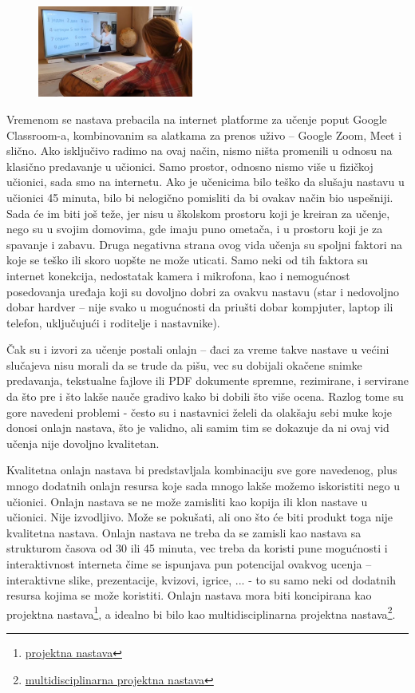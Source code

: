 \documentclass[a4paper]{article}
\begin{document}
\begin{figure}[h!]
        \centering\includegraphics[height=3cm]{onlajn-nastava.jpg} 
        \caption{}
        \label{fig:onlajn nastava}
\end{figure}
Vremenom se nastava prebacila na internet platforme za učenje poput Google Classroom-a, kombinovanim sa alatkama za prenos uživo – Google Zoom, Meet i slično. Ako isključivo radimo na ovaj način, nismo ništa promenili u odnosu na klasično predavanje u učionici. Samo prostor, odnosno nismo više u fizičkoj učionici, sada smo na internetu. Ako je učenicima bilo teško da slušaju nastavu u učionici 45 minuta, bilo bi nelogično pomisliti da bi ovakav način bio uspešniji. Sada će im biti još teže, jer nisu u školskom prostoru koji je kreiran za učenje, nego su u svojim domovima, gde imaju puno ometača, i u prostoru koji je za spavanje i zabavu. Druga negativna strana ovog vida učenja su spoljni faktori na koje se teško ili skoro uopšte ne može uticati. Samo neki od tih faktora su internet konekcija, nedostatak kamera i mikrofona, kao i nemogućnost posedovanja uređaja koji su dovoljno dobri za ovakvu nastavu (star i nedovoljno dobar hardver – nije svako u mogućnosti da priušti dobar kompjuter, laptop ili telefon, uključujući i roditelje i nastavnike).

Čak su i izvori za učenje postali onlajn – đaci za vreme takve nastave u većini slučajeva nisu morali da se trude da pišu, vec su dobijali okačene snimke predavanja, tekstualne fajlove ili PDF dokumente spremne, rezimirane, i servirane da što pre i što lakše nauče gradivo kako bi dobili što više ocena. Razlog tome su gore navedeni problemi -  često su i nastavnici želeli da olakšaju sebi muke koje donosi onlajn nastava, što je validno, ali samim tim se dokazuje da ni ovaj vid učenja nije dovoljno kvalitetan. 

Kvalitetna onlajn nastava bi predstavljala kombinaciju sve gore navedenog, plus mnogo dodatnih onlajn resursa koje sada mnogo lakše možemo iskoristiti nego u učionici. Onlajn nastava se ne može zamisliti kao kopija ili klon nastave u učionici. Nije izvodljivo. Može se pokušati, ali ono što će biti produkt toga nije kvalitetna nastava. Onlajn nastava ne treba da se zamisli kao nastava sa strukturom časova od 30 ili 45 minuta, vec treba da koristi pune mogućnosti i interaktivnost interneta čime se ispunjava pun potencijal ovakvog ucenja – interaktivne slike, prezentacije, kvizovi, igrice, ... - to su samo neki od dodatnih resursa kojima se može koristiti. Onlajn nastava mora biti koncipirana kao projektna nastava\footnote{\href{https://en.wikipedia.org/wiki/Project-based_learning}{projektna nastava} }, a idealno bi bilo kao multidisciplinarna projektna nastava\footnote{\href{https://careercenter.utsa.edu/blog/2018/05/03/multidisciplinary-studies-so-what-does-that-mean/}{multidisciplinarna projektna nastava} }. 
\end{document}
